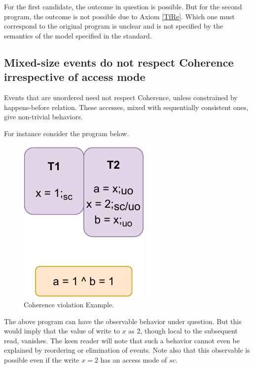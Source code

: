         For the first candidate, the outcome in question is possible.
        But for the second program, the outcome is not possible due to Axiom \ref{TfRe}.
        Which one must correspond to the original program is unclear and is not specified by the semantics of the model specified in the standard.

    \subsection{Mixed-size events do not respect Coherence irrespective of access mode}

        Events that are unordered need not respect Coherence, unless constrained by happens-before relation.
        These accesses, mixed with sequentially consistent ones, give non-trivial behaviors.

        For instance  consider the program below.

        \begin{figure}[H]
            \centering
            \includegraphics[scale=0.7]{7.ConclusionFutureWork/CoherenceNormal.pdf}
            \caption{Coherence violation Example.}
        \end{figure}


        The above program can have the observable behavior under question.
        But this would imply that the value of write to $x$ as $2$, though local to the subsequent read, vanishes. 
        The keen reader will note that such a behavior cannot even be explained by reordering or elimination of events.
        Note also that this observable is possible even if the write $x=2$ has an access mode of $sc$. 

